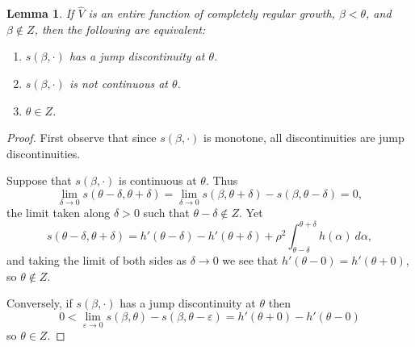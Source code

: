 \documentclass[reqno,12pt,letterpaper]{amsart}
\newtheorem{lemma}[theorem]{Lemma}
\theoremstyle{definition}
\begin{document}
\begin{lemma}
\label{characterizing jump discontinuity}
If $\widehat V$ is an entire function of completely regular growth, $\beta < \theta$, and $\beta \notin Z$, then the following are equivalent:
\begin{enumerate}
\item $s(\beta, \cdot)$ has a jump discontinuity at $\theta$.
\item $s(\beta, \cdot)$ is not continuous at $\theta$.
\item $\theta \in Z$.
\end{enumerate}
\end{lemma}
\begin{proof}
First observe that since $s(\beta, \cdot)$ is monotone, all discontinuities are jump discontinuities.

Suppose that $s(\beta, \cdot)$ is continuous at $\theta$.
Thus
$$\lim_{\delta \to 0} s(\theta - \delta, \theta + \delta) = \lim_{\delta \to 0} s(\beta, \theta + \delta) - s(\beta, \theta - \delta) = 0,$$
the limit taken along $\delta > 0$ such that $\theta - \delta \notin Z$. Yet
$$s(\theta - \delta, \theta + \delta) = h'(\theta - \delta) - h'(\theta + \delta) + \rho^2 \int_{\theta - \delta}^{\theta + \delta} h(\alpha)~d\alpha,$$
and taking the limit of both sides as $\delta \to 0$ we see that $h'(\theta - 0) = h'(\theta + 0)$, so $\theta \notin Z$.

Conversely, if $s(\beta, \cdot)$ has a jump discontinuity at $\theta$ then
$$0 < \lim_{\varepsilon \to 0} s(\beta, \theta) - s(\beta, \theta - \varepsilon) = h'(\theta + 0) - h'(\theta - 0)$$
so $\theta \in Z$.
\end{proof}
\end{document}
